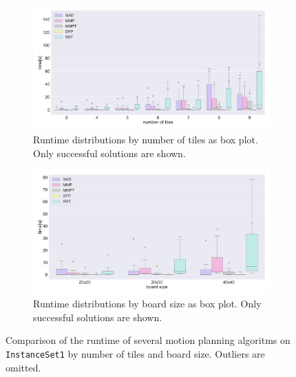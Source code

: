 \begin{figure}[htpb]
\centering
\begin{subfigure}[b]{\textwidth}
\centering
\includegraphics[width=\textwidth]{figures/plots/heuristic_solvers_i1/i1_time_over_tiles.pdf}
\caption{Runtime distributions by number of tiles as box plot. Only successful solutions are shown.}
\label{fig:hs_i1_time_over_tiles}
\end{subfigure}
\begin{subfigure}[b]{\textwidth}
\centering
\includegraphics[width=\textwidth]{figures/plots/heuristic_solvers_i1/i1_time_over_board_size.pdf}
\caption{Runtime distributions by board size as box plot. Only successful solutions are shown.}
\label{fig:hs_i1_time_over_board_size}
\end{subfigure}
\caption[Runtime of several planners on \texttt{InstanceSet1}]{Comparison of the runtime of several motion planning algoritms on \texttt{InstanceSet1} by number of tiles and board size. Outliers are omitted.}
\label{fig:i1_performance1}
\end{figure}
